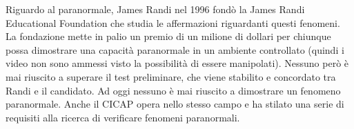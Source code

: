 \documentclass[12pt]{book} %
\begin{document}
\begin{mdframed}[linewidth=1pt]
Riguardo al paranormale, James Randi nel 1996 fondò la James Randi Educational Foundation che studia le
affermazioni riguardanti questi fenomeni. La fondazione mette in palio un premio di un milione di dollari per chiunque
possa dimostrare una capacità paranormale in un ambiente controllato (quindi i video non sono ammessi visto la possibilità di essere manipolati). 
Nessuno però è mai riuscito a superare il test preliminare, che viene
stabilito e concordato tra Randi e il candidato. Ad oggi nessuno è mai riuscito a dimostrare un fenomeno paranormale.
Anche il CICAP opera nello stesso campo e ha stilato una serie di
requisiti alla ricerca di verificare fenomeni paranormali.
\end{mdframed}
\end{document}
